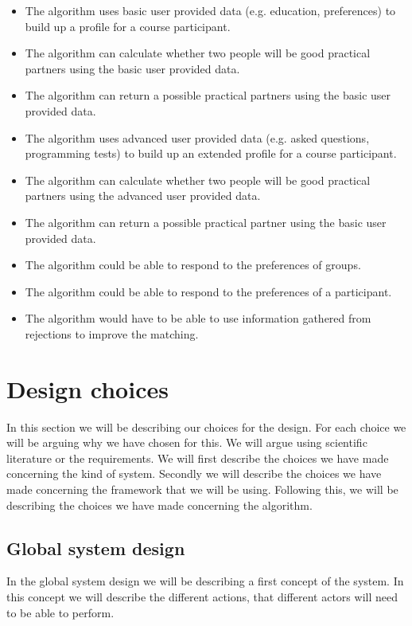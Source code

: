 \begin{itemize}
\item The algorithm uses basic user provided data (e.g. education, preferences) to build up a profile for a course participant.
\item The algorithm can calculate whether two people will be good practical partners using the basic user provided data.
\item The algorithm can return a possible practical partners using the basic user provided data.
\end{itemize}

\begin{itemize}
\item The algorithm uses advanced user provided data (e.g. asked questions, programming tests) to build up an extended profile for a course participant.
\item The algorithm can calculate whether two people will be good practical partners using the advanced user provided data.
\item The algorithm can return a possible practical partner using the basic user provided data.
\item The algorithm could be able to respond to the preferences of groups.
\item The algorithm could be able to respond to the preferences of a participant.
\end{itemize}

\begin{itemize}
\item The algorithm would have to be able to use information gathered from rejections to improve the matching.
\end{itemize}

\section*{Design choices}
In this section we will be describing our choices for the design.
For each choice we will be arguing why we have chosen for this.
We will argue using scientific literature or the requirements.
We will first describe the choices we have made concerning the kind of system.
Secondly we will describe the choices we have made concerning the framework that we will be using.
Following this, we will be describing the choices we have made concerning the algorithm.

\subsection*{Global system design}
In the global system design we will be describing a first concept of the system.
In this concept we will describe the different actions, that different actors will need to be able to perform.

